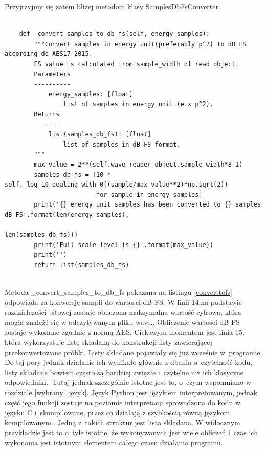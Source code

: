 \documentclass[eng,printmode]{mgr}
\begin{document}
Przyjrzyjmy się zatem bliżej metodom klasy SamplesDbFsConverter.

\begin{minipage}{\linewidth}
\begin{lstlisting}[caption={fragment kodu źródłowego pliku SampledBConverter.py, klasa SamplesDbFSConverter, metoda \_convert\_samples\_to\_db\_fs},captionpos=b,label={converttofs}]

    def _convert_samples_to_db_fs(self, energy_samples):
        """Convert samples in energy unit(preferably p^2) to dB FS according do AES17-2015.
        FS value is calculated from sample_width of read object.
        Parameters
        ----------
            energy_samples: [float]
                list of samples in energy unit (e.x p^2).
        Returns
        -------
            list(samples_db_fs): [float]
                list of samples in dB FS format.
        """
        max_value = 2**(self.wave_reader_object.sample_width*8-1)
        samples_db_fs = [10 * self._log_10_dealing_with_0((sample/max_value**2)*np.sqrt(2))
                         for sample in energy_samples]
        print('{} energy unit samples has been converted to {} samples dB FS'.format(len(energy_samples),
                                                                                     len(samples_db_fs)))
        print('Full scale level is {}'.format(max_value))
        print('')
        return list(samples_db_fs)
    
\end{lstlisting}
\end{minipage}

Metoda \_convert\_samples\_to\_db\_fs pokazana na listingu \ref{converttofs} odpowiada za konwersję sampli do wartosci dB FS. W linii 14.na podstawie rozdzielczości bitowej zostaje obliczona maksymalna wartość cyfrowa, która mogła znaleźć się w odczytywanym pliku wave.\cite{Cyfrowe_przetwarzanie_sygnalow}. Obliczenie wartości dB FS zostaje wykonane zgodnie z normą AES\cite{AES17}. Ciekawym momentem jest linia 15, która wykorzystuje listę składaną do konstrukcji listy zawierającej przekonwertowane próbki. Listy składane pojawiały się już wcześnie w~programie. Do tej pory jednak działanie ich wynikało głównie z dbania o~czytelność kodu, listy składane bowiem często są bardziej zwięzłe i~czytelne niż ich klasyczne odpowiedniki.\cite{Python_data_structures}. Tutaj jednak szczególnie istotne jest to, o~czym wspomniano w rozdziale \ref{wybrany_jezyk}. Język Python jest językiem interpretowanym, jednak część jego funkcji zostaje na poziomie interpretacji sprowadzona do kodu w języku C i~skompilowane, przez co działają z szybkością równą językom kompilowanym.\cite{Wprowadzenie_python}. Jedną z~takich struktur jest lista składana. W widocznym przykładzie jest to o~tyle istotne, że wykonywanych jest wiele obliczeń i~czas ich wykonania jest istotnym elementem całego czasu działania programu.
\end{document}

